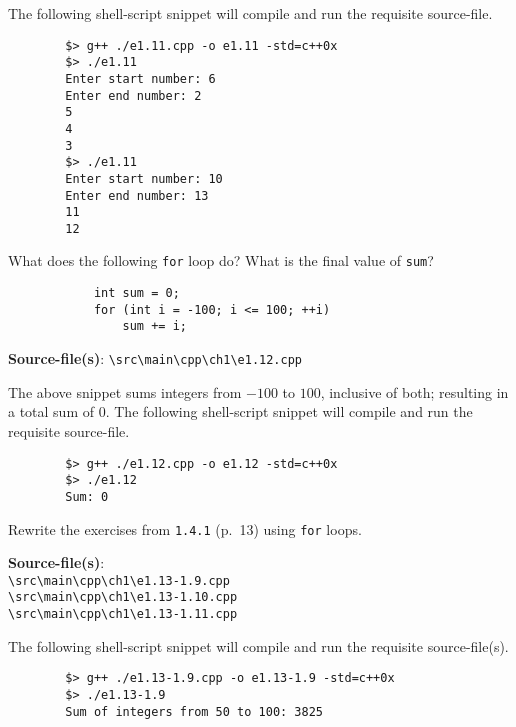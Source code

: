 \documentclass[12pt, a4paper]{article}
\begin{document}
    \noindent The following shell-script snippet will compile and run the requisite source-file.
    \begin{verbatim}
        $> g++ ./e1.11.cpp -o e1.11 -std=c++0x
        $> ./e1.11
        Enter start number: 6
        Enter end number: 2
        5
        4
        3
        $> ./e1.11
        Enter start number: 10
        Enter end number: 13
        11
        12
    \end{verbatim}

    \bigskip
    \begin{tcolorbox}[title={Exercise: 1.12}]
        What does the following \texttt{for} loop do?
        What is the final value of \texttt{sum}?
        \begin{verbatim}
            int sum = 0;
            for (int i = -100; i <= 100; ++i)
                sum += i;
        \end{verbatim}
    \end{tcolorbox}
    \noindent\textbf{Source-file(s)}: \texttt{\textbackslash src\textbackslash main\textbackslash cpp\textbackslash ch1\textbackslash e1.12.cpp}

    \noindent The above snippet sums integers from $-100$ to $100$, inclusive of both; resulting in a total sum of $0$.
    The following shell-script snippet will compile and run the requisite source-file.
    \begin{verbatim}
        $> g++ ./e1.12.cpp -o e1.12 -std=c++0x
        $> ./e1.12
        Sum: 0
    \end{verbatim}

    \bigskip
    \begin{tcolorbox}[title={Exercise: 1.13}]
        Rewrite the exercises from \texttt{1.4.1} (p.~13) using \texttt{for} loops.
    \end{tcolorbox}
    \noindent\textbf{Source-file(s)}:
    \\ \texttt{\textbackslash src\textbackslash main\textbackslash cpp\textbackslash ch1\textbackslash e1.13-1.9.cpp}
    \\ \texttt{\textbackslash src\textbackslash main\textbackslash cpp\textbackslash ch1\textbackslash e1.13-1.10.cpp}
    \\ \texttt{\textbackslash src\textbackslash main\textbackslash cpp\textbackslash ch1\textbackslash e1.13-1.11.cpp}

    \noindent The following shell-script snippet will compile and run the requisite source-file(s).
    \begin{verbatim}
        $> g++ ./e1.13-1.9.cpp -o e1.13-1.9 -std=c++0x
        $> ./e1.13-1.9
        Sum of integers from 50 to 100: 3825
    \end{verbatim}
\end{document}
